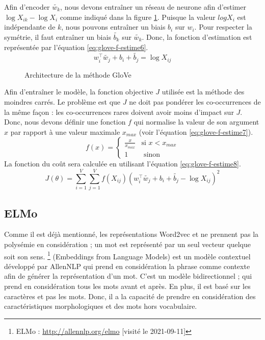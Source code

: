\documentclass{KodeBook}
\begin{document}
Afin d'encoder $\tilde{w_k}$, nous devons entraîner un réseau de neurone afin d'estimer $\log X_{ik} - \log X_i$ comme indiqué dans la figure \ref{fig:glove-arch}. 
Puisque la valeur $log X_i$ est indépendante de $k$, nous pouvons entraîner un biais $b_i$ sur $w_i$. 
Pour respecter la symétrie, il faut entraîner un biais $\tilde{b_k}$ sur $\tilde{w_k}$. 
Donc, la fonction d'estimation est représentée par l'équation \ref{eq:glove-f-estime6}.
\begin{equation}
w_i^\top \tilde{w_j} + b_i + \tilde{b_j} = \log X_{ij}
\label{eq:glove-f-estime6}
\end{equation}
\begin{figure}[!ht]
	\centering
	\caption{Architecture de la méthode GloVe}
	\label{fig:glove-arch}
\end{figure}
Afin d'entraîner le modèle, la fonction objective $J$ utilisée est la méthode des moindres carrés.
Le problème est que $J$ ne doit pas pondérer les co-occurrences de la même façon : les co-occurrences rares doivent avoir moins d'impact sur $J$.
Donc, nous devons définir une fonction $f$ qui normalise la valeur de son argument $x$ par rapport à une valeur maximale $x_{max}$ (voir l'équation \ref{eq:glove-f-estime7}).
\begin{equation}
f(x) = \begin{cases}
\frac{x}{x_{max}} & \text{si } x < x_{max} \\
1 & \text{ sinon}
\end{cases}
\label{eq:glove-f-estime7}
\end{equation}
La fonction du coût sera calculée en utilisant l'équation \ref{eq:glove-f-estime8}.
\begin{equation}
J(\theta) = \sum_{i=1}^{V} \sum_{j=1}^{V} f(X_{ij}) (w_i^\top \tilde{w_j} + b_i + \tilde{b_j} - \log X_{ij})^2
\label{eq:glove-f-estime8}
\end{equation}


\subsection{ELMo}

Comme il est déjà mentionné, les représentations Word2vec et  ne prennent pas la polysémie en considération ; un mot est représenté par un seul vecteur quelque soit son sens. 
\footnote{ELMo : \url{http://allennlp.org/elmo} [visité le 2021-09-11]} (Embeddings from Language Models) est un modèle contextuel développé par AllenNLP \cite{2018-peters-al} qui prend en considération la phrase comme contexte afin de générer la représentation d'un mot. 
C'est un modèle bidirectionnel ; qui prend en considération tous les mots avant et après. 
En plus, il est basé sur les caractères et pas les mots. 
Donc, il a la capacité de prendre en considération des caractéristiques morphologiques et des mots hors vocabulaire.
\end{document}
